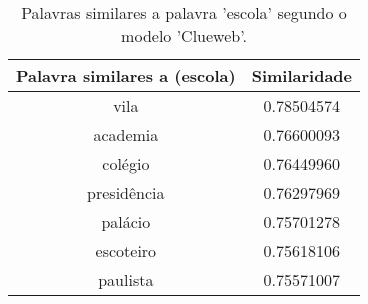 \begin{table}[H]
\centering
\begin{tabular}{|c | c|}
 \hline
 Palavra similares a (escola) & Similaridade \\ [0.5ex]
 \hline
 vila & 0.78504574 \\
 \hline
 academia & 0.76600093 \\
 \hline
 colégio & 0.76449960 \\
 \hline
 presidência & 0.76297969 \\
 \hline
 palácio & 0.75701278 \\
 \hline
 escoteiro & 0.75618106 \\
 \hline
 paulista & 0.75571007 \\
 \hline
\end{tabular}
\caption{Palavras similares a palavra 'escola' segundo o modelo 'Clueweb'.}
\label{table:1}
\end{table}

